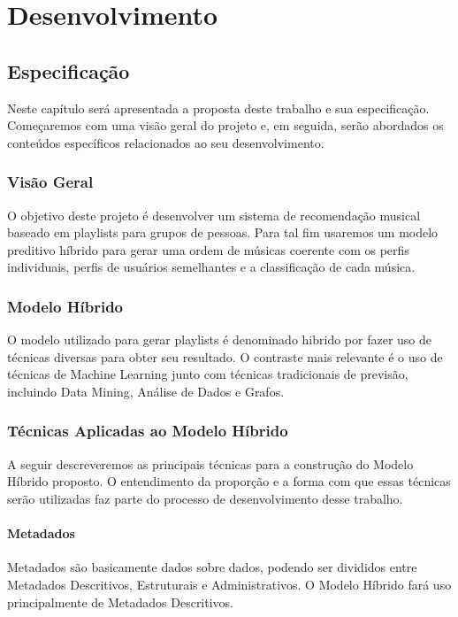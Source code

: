 \documentclass[
	12pt,				%
    oneside,			%
	a4paper,			%
	english,			%
	french,				%
	spanish,			%
	brazil,				%
	]{abntex2}
\begin{document}
\part{Desenvolvimento}


\chapter{Especificação}

Neste capítulo será apresentada a proposta deste trabalho e sua especificação. Começaremos com uma visão geral do projeto e, em seguida, serão abordados os conteúdos específicos relacionados ao seu desenvolvimento.

\section{Visão Geral}

O objetivo deste projeto é desenvolver um sistema de recomendação musical baseado em playlists para grupos de pessoas. Para tal fim usaremos um modelo preditivo híbrido para gerar uma ordem de músicas coerente com os perfis individuais, perfis de usuários semelhantes e a classificação de cada música.

\section{Modelo Híbrido}

O modelo utilizado para gerar playlists é denominado hibrido por fazer uso de técnicas diversas para obter seu resultado. O contraste mais relevante é o uso de técnicas de Machine Learning junto com técnicas tradicionais de previsão, incluindo Data Mining, Análise de Dados e Grafos.

\section{Técnicas Aplicadas ao Modelo Híbrido} 
A seguir descreveremos as principais técnicas para a construção do Modelo Híbrido proposto. O entendimento da proporção e a forma com que essas técnicas serão utilizadas faz parte do processo de desenvolvimento desse trabalho.

\subsection{Metadados}
Metadados são basicamente dados sobre dados, podendo ser divididos entre Metadados Descritivos, Estruturais e Administrativos. O Modelo Híbrido fará uso principalmente de Metadados Descritivos.
\end{document}
